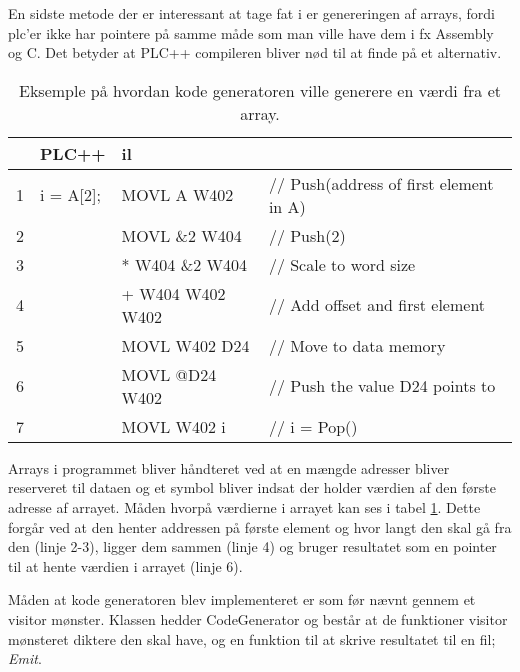 {

\noindent En sidste metode der er interessant at tage fat i er genereringen af arrays, fordi \gls{plc}'er ikke har pointere på samme måde som man ville have dem i fx Assembly og C. Det betyder at PLC++ compileren bliver nød til at finde på et alternativ.

\begin{table}[H]
    \centering\ttfamily
    \begin{tabular}{l|l|l l}
         &PLC++       & \gls{il} \\\hline
        1&i = A[2];   & MOVL A W402       &// Push(address of first element in A)\\
        2&            & MOVL \&2 W404     &// Push(2)\\
        3&            & * W404 \&2 W404   &// Scale to word size\\
        4&            & + W404 W402 W402  &// Add offset and first element\\
        5&            & MOVL W402 D24     &// Move to data memory\\
        6&            & MOVL @D24 W402    &// Push the value D24 points to\\
        7&            & MOVL W402 i       &// i = Pop()
    \end{tabular}
    \caption{Eksemple på hvordan kode generatoren ville generere en værdi fra et array.}
    \label{tab:codegenArray}
\end{table}

\noindent Arrays i programmet bliver håndteret ved at en mængde adresser bliver reserveret til dataen og et symbol bliver indsat der holder værdien af den første adresse af arrayet. Måden hvorpå værdierne i arrayet kan ses i tabel \ref{tab:codegenArray}. Dette forgår ved at den henter addressen på første element og hvor langt den skal gå fra den (linje 2-3), ligger dem sammen (linje 4) og bruger resultatet som en pointer til at hente værdien i arrayet (linje 6).

Måden at kode generatoren blev implementeret er som før nævnt gennem et visitor mønster. Klassen hedder CodeGenerator og består at de funktioner visitor mønsteret diktere den skal have, og en funktion til at skrive resultatet til en fil; \textit{Emit}.

}
